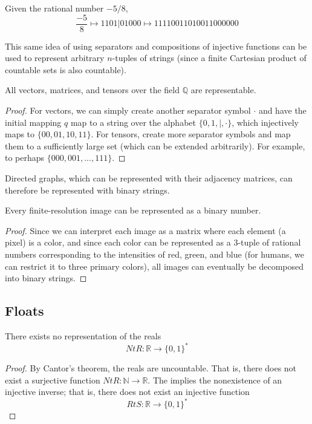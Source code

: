   \begin{example}
  Given the rational number $-5/8$,
  \[\frac{-5}{8} \mapsto 1101|01000 \mapsto 11110011010011000000\]
  \end{example}

  This same idea of using separators and compositions of injective functions can be used to represent arbitrary $n$-tuples of strings (since a finite Cartesian product of countable sets is also countable). 

  \begin{theorem}
    All vectors, matrices, and tensors over the field $\mathbb{Q}$ are representable. 
  \end{theorem}
  \begin{proof}
    For vectors, we can simply create another separator symbol $\cdot$ and have the initial mapping $q$ map to a string over the alphabet $\{0, 1, |, \cdot\}$, which injectively maps to $\{00, 01, 10, 11\}$. 
    For tensors, create more separator symbols and map them to a sufficiently large set (which can be extended arbitrarily). For example, to perhaps $\{000, 001, ..., 111\}$. 

  \end{proof}

  \begin{corollary}
    Directed graphs, which can be represented with their adjacency matrices, can therefore be represented with binary strings. 
  \end{corollary}

  \begin{theorem}
    Every finite-resolution image can be represented as a binary number. 
  \end{theorem}
  \begin{proof}
    Since we can interpret each image as a matrix where each element (a pixel) is a color, and since each color can be represented as a 3-tuple of rational numbers corresponding to the intensities of red, green, and blue (for humans, we can restrict it to three primary colors), all images can eventually be decomposed into binary strings. 
  \end{proof}

\subsection{Floats} 

  \begin{theorem}
    There exists no representation of the reals
    \begin{equation}
      NtR: \mathbb{R} \longrightarrow \{0, 1\}^\ast
    \end{equation}
  \end{theorem}
  \begin{proof}
    By Cantor's theorem, the reals are uncountable. That is, there does not exist a surjective function $NtR: \mathbb{N} \longrightarrow \mathbb{R}$. The implies the nonexistence of an injective inverse; that is, there does not exist an injective function 
    \[RtS: \mathbb{R} \longrightarrow \{0,1\}^\ast\]
  \end{proof}


